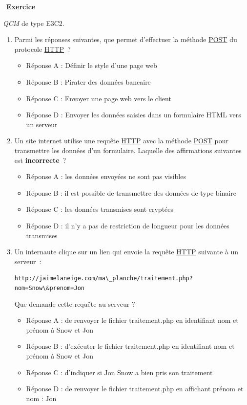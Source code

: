 \documentclass[
  11pt,
]{article}
\newcommand{\passthrough}[1]{#1}
\providecommand{\tightlist}{%
  \setlength{\itemsep}{0pt}\setlength{\parskip}{0pt}}
\newcounter{exo}
\newenvironment{exercice}[1]
{\par \medskip   \addtocounter{exo}{1} \noindent  
\begin{bclogo}[arrondi =0.1,   noborder = true, logo=\bccrayon, marge=4]{~\textbf{Exercice} \textbf{\theexo} {\itshape #1} }  \par}
{
\end{bclogo}
 \par \bigskip }
\newcounter{def}
\begin{document}
\begin{exercice}{}

\emph{QCM} de type E3C2.

\begin{enumerate}
\def\labelenumi{\arabic{enumi}.}
\item
  Parmi les réponses suivantes, que permet d'effectuer la méthode
  \href{https://developer.mozilla.org/fr/docs/Web/HTTP/M\%C3\%A9thode/POST}{POST}
  du protocole
  \href{https://developer.mozilla.org/fr/docs/Glossaire/HTTP}{HTTP}~?

  \begin{itemize}
  \tightlist
  \item
    Réponse A : Définir le style d'une page web
  \item
    Réponse B : Pirater des données bancaire
  \item
    Réponse C : Envoyer une page web vers le client
  \item
    Réponse D : Envoyer les données saisies dans un formulaire HTML vers
    un serveur
  \end{itemize}
\item
  Un site internet utilise une requête
  \href{https://developer.mozilla.org/fr/docs/Glossaire/HTTP}{HTTP} avec
  la méthode
  \href{https://developer.mozilla.org/fr/docs/Web/HTTP/M\%C3\%A9thode/POST}{POST}
  pour transmettre les données d'un formulaire. Laquelle des
  affirmations suivantes est \textbf{incorrecte}~?

  \begin{itemize}
  \tightlist
  \item
    Réponse A : les données envoyées ne sont pas visibles
  \item
    Réponse B : il est possible de transmettre des données de type
    binaire
  \item
    Réponse C : les données transmises sont cryptées
  \item
    Réponse D : il n'y a pas de restriction de longueur pour les données
    transmises
  \end{itemize}
\item
  Un internaute clique sur un lien qui envoie la requête
  \href{https://developer.mozilla.org/fr/docs/Glossaire/HTTP}{HTTP}
  suivante à un serveur~:

  \passthrough{\lstinline!http://jaimelaneige.com/ma\_planche/traitement.php?nom=Snow\&prenom=Jon!}

  Que demande cette requête au serveur ?

  \begin{itemize}
  \tightlist
  \item
    Réponse A : de renvoyer le fichier traitement.php en identifiant nom
    et prénom à Snow et Jon
  \item
    Réponse B : d'exécuter le fichier traitement.php en identifiant nom
    et prénom à Snow et Jon
  \item
    Réponse C : d'indiquer si Jon Snow a bien pris son traitement
  \item
    Réponse D : de renvoyer le fichier traitement.php en affichant
    prénom et nom : Jon
  \end{itemize}
\end{enumerate}


\end{exercice}
\end{document}
